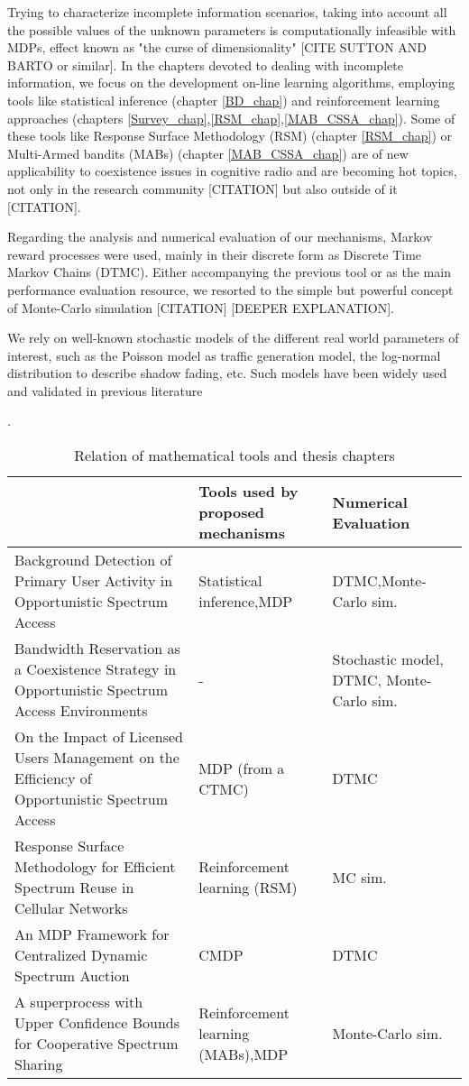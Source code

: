 Trying to characterize incomplete information scenarios, taking into account all the possible values of the unknown parameters is computationally infeasible with MDPs, effect known as "the curse of dimensionality" [CITE SUTTON AND BARTO or similar]. 
In the chapters devoted to dealing with incomplete information, we focus on the development on-line learning algorithms, employing tools like statistical inference (chapter \ref{BD_chap}) and reinforcement learning approaches (chapters \ref{Survey_chap},\ref{RSM_chap},\ref{MAB_CSSA_chap}). Some of these tools like Response Surface Methodology (RSM) (chapter \ref{RSM_chap}) or Multi-Armed bandits (MABs) (chapter \ref{MAB_CSSA_chap}) are of new applicability to coexistence issues in cognitive radio and are becoming hot topics, not only in the research community [CITATION] but also outside of it [CITATION].

Regarding the analysis and numerical evaluation of our mechanisms, Markov reward processes were used, mainly in their discrete form as Discrete Time Markov Chains (DTMC). Either accompanying the previous tool or as the main performance evaluation resource, we resorted to the simple but powerful concept of Monte-Carlo simulation [CITATION] [DEEPER EXPLANATION]. 

We rely on well-known stochastic models of the different real world parameters of interest, such as the Poisson model as traffic generation model, the log-normal distribution to describe shadow fading, etc. Such models have been widely used and validated in previous literature \cite{ref:Goldsmith2}
\begin{table}.
\begin{tabular}{|m{5cm}|H{3.5cm}|H{3.5cm}|} \hline
& \textbf{Tools used by proposed mechanisms} & \textbf{Numerical Evaluation}\\\hline
Background Detection of Primary User Activity in Opportunistic Spectrum Access & Statistical inference,\newline MDP & DTMC,\newline Monte-Carlo sim.\\\hline
Bandwidth Reservation as a Coexistence Strategy in Opportunistic Spectrum Access Environments & - & Stochastic model, DTMC, Monte-Carlo sim.\\\hline
On the Impact of Licensed Users Management on the Efficiency of Opportunistic Spectrum Access
 & MDP (from a CTMC) & DTMC \\\hline
Response Surface Methodology for Efficient Spectrum Reuse in Cellular Networks & Reinforcement learning (RSM) & MC sim.\\\hline
An MDP Framework for Centralized Dynamic Spectrum Auction & CMDP & DTMC \\\hline
A superprocess with Upper Confidence Bounds for Cooperative Spectrum Sharing & Reinforcement learning (MABs),\newline MDP & Monte-Carlo sim. \\\hline
\end{tabular}
\centering
\caption{Relation of mathematical tools and thesis chapters}
\label{intro_table_math_tools}
\end{table}


